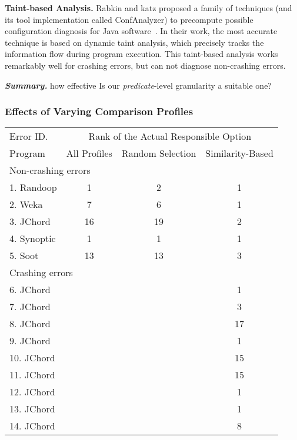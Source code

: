 \vspace{1mm}
\noindent \textbf{Taint-based Analysis.}
Rabkin and katz proposed a family of techniques (and its tool implementation called ConfAnalyzer)
to precompute possible
configuration diagnosis for Java software~\cite{Rabkin:2011:PPC}. In their work,
the most accurate technique is based on dynamic taint analysis, which precisely
tracks the information flow during program execution. %
This taint-based analysis works remarkably well for crashing errors, but can
not diagnose non-crashing errors.


\vspace{1mm}
\noindent \textbf{\textit{Summary.}} how effective
Is our \textit{predicate}-level granularity a suitable one?

\subsubsection{Effects of Varying Comparison Profiles}
\label{sec:ranking}


\begin{table}[t]
\setlength{\tabcolsep}{.24\tabcolsep}
\begin{tabular}{|l|c|c||c|}
\hline
 Error ID. & \multicolumn{3}{|c|}{Rank of the Actual Responsible Option } \\
\cline{2-4}
 Program & All Profiles & Random Selection&  Similarity-Based\\
 \hline
\hline
\multicolumn{4}{|l|}{Non-crashing errors}   \\
 \hline
 1. Randoop & 1 & 2 & 1\\
 2. Weka & 7 & 6 & 1\\
 3. JChord & 16 & 19 & 2\\
 4. Synoptic & 1 & 1 & 1\\
 5. Soot & 13 & 13 & 3\\
\hline
\hline
\multicolumn{4}{|l|}{Crashing errors}   \\
\hline
 6. JChord & & &1\\
 7. JChord & & &3\\
 8. JChord & & &17\\
 9. JChord & & &1\\
 10. JChord & & &15\\
 11. JChord & & &15\\
 12. JChord & & &1\\
 13. JChord & & &1\\
 14. JChord & & &8\\
\hline
\end{tabular}

\end{table}


